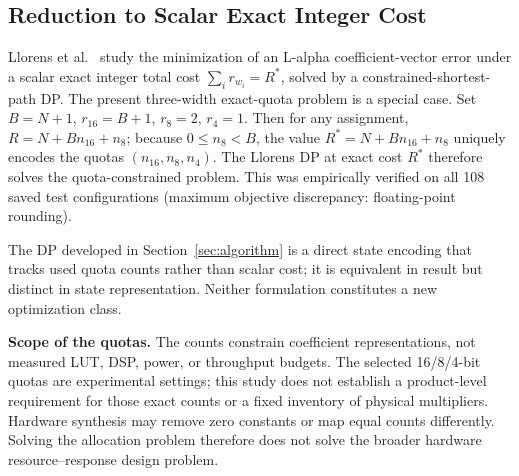 \subsection{Reduction to Scalar Exact Integer Cost}

Llorens et al.~\cite{llorens2005integercost} study the minimization of
an L-alpha coefficient-vector error under a scalar exact integer total
cost $\sum_i r_{w_i} = R^*$, solved by a constrained-shortest-path DP.
The present three-width exact-quota problem is a special case. Set
$B = N+1$, $r_{16} = B+1$, $r_8 = 2$, $r_4 = 1$. Then for any
assignment, $R = N + B n_{16} + n_8$; because $0 \le n_8 < B$, the
value $R^* = N + B n_{16} + n_8$ uniquely encodes the quotas
$(n_{16}, n_8, n_4)$. The Llorens DP at exact cost $R^*$ therefore
solves the quota-constrained problem. This was empirically verified on
all 108 saved test configurations (maximum objective discrepancy:
floating-point rounding).

The DP developed in Section~\ref{sec:algorithm} is a direct state
encoding that tracks used quota counts rather than scalar cost; it is
equivalent in result but distinct in state representation. Neither
formulation constitutes a new optimization class.


\noindent\textbf{Scope of the quotas.}\quad
The counts constrain coefficient representations, not measured LUT,
DSP, power, or throughput budgets. The selected 16/8/4-bit quotas are
experimental settings; this study does not establish a product-level
requirement for those exact counts or a fixed inventory of physical
multipliers. Hardware synthesis may remove zero constants or map equal
counts differently. Solving the allocation problem therefore does not
solve the broader hardware resource--response design problem.
